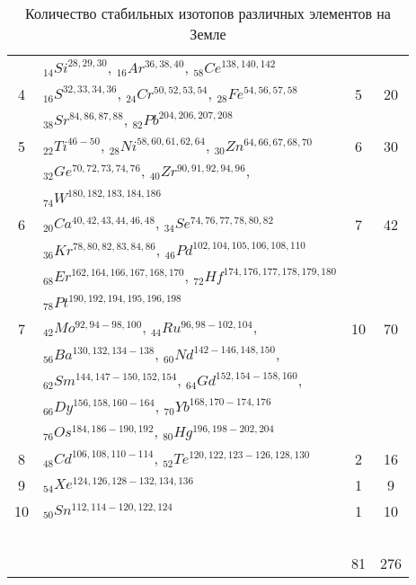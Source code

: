 \documentclass[a5paper,openany]{book}
\begin{document}
\begin{table}
{\begin{tabular}{cp{6cm}cc}
				~ &  $_{14}Si^{28, 29, 30}, \, _{16}Ar^{36, 38, 40}, \,  _{58}Ce^{138, 140, 142} $ & ~ & ~ \\ [1mm]
				4 &  $_{16}S^{32, 33, 34, 36}, \, _{24}Cr^{50, 52, 53, 54}, \,  _{28}Fe^{54, 56, 57, 58} $ & 5 & 20 \\ [1mm]
				~ &  $_{38}Sr^{84, 86, 87, 88}, \,  _{82}Pb^{204, 206, 207, 208} $ & ~ & ~ \\ [1mm]
				5 &  $_{22}Ti^{46-50}, \, _{28}Ni^{58, 60, 61, 62, 64}, \, _{30}Zn^{64, 66, 67, 68, 70} $ & 6 & 30 \\ [1mm]
				~ &  $_{32}Ge^{70, 72, 73, 74, 76}, \, _{40}Zr^{90, 91, 92, 94, 96}, $ & ~ & ~ \\ [1mm]
				~ &  $_{74}W^{180, 182, 183, 184, 186} $ & ~ & ~ \\ [1mm]
				6 &  $_{20}Ca^{40, 42, 43, 44, 46, 48}, \, _{34}Se^{74, 76, 77, 78, 80, 82} $ & 7 & 42 \\ [1mm]
				~ &  $_{36}Kr^{78, 80, 82, 83, 84, 86},  \,_{46}Pd^{102, 104, 105, 106, 108, 110} $ & ~ & ~ \\ [1mm]
				~ &  $_{68}Er^{162, 164, 166, 167, 168, 170},  \, _{72}Hf^{174, 176, 177, 178, 179, 180} $ & ~ & ~ \\ [1mm]
				~ &  $_{78}Pt^{190, 192, 194, 195, 196, 198} $ & ~ & ~ \\ [1mm]
				7 &  $_{42}Mo^{92, 94-98, 100}, \, _{44}Ru^{96, 98-102, 104}, \, $ & 10 & 70 \\ [1mm]
				~ &  $_{56}Ba^{130, 132, 134-138}, \, _{60}Nd^{142-146, 148, 150}, $ & ~ & ~ \\ [1mm]
				~ &  $_{62}Sm^{144, 147-150, 152, 154}, \, _{64}Gd^{152, 154-158, 160},$ & ~ & ~ \\ [1mm]
				~ &  $_{66}Dy^{156, 158, 160-164}, \, _{70}Yb^{168, 170-174, 176} $ & ~ & ~ \\ [1mm]
				~ &  $_{76}Os^{184, 186-190, 192}, \, _{80}Hg^{196, 198-202, 204} $ & ~ & ~ \\ [1mm]
				8 &  $_{48}Cd^{106, 108,  110-114}, \, _{52}Te^{120, 122, 123-126, 128, 130}$ & 2 & 16 \\ [1mm]
				9 &  $_{54}Xe^{124, 126, 128-132, 134, 136}$ & 1 & 9 \\ [1mm]
				10 &  $_{50}Sn^{112, 114-120, 122, 124}$ & 1 & 10 \\ [1mm]
				\hline
				~ & ~ &  ~ &  ~\\
				~ & ~ & 81 & 276
			\end{tabular}
		}
		\caption{Количество стабильных изотопов различных элементов на Земле}
		\label{t:IsotopeCounts}
	\end{table} 
	
\end{document}
